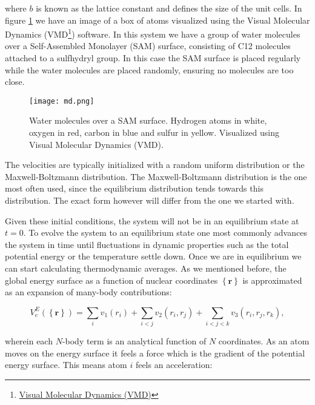 where $b$ is known as the lattice constant and defines
the size of the unit cells.
In figure \ref{fig:md} we have an image of a
box of atoms visualized using the Visual Molecular Dynamics (VMD\footnote
{\href{https://www.ks.uiuc.edu/Research/vmd/}{Visual Molecular Dynamics (VMD)}}) software.
In this system we have a group of water molecules over a Self-Assembled
Monolayer (SAM) surface, consisting of C12 molecules attached to a 
sulfhydryl group. In this case the SAM surface is placed regularly
while the water molecules are placed randomly, ensuring no molecules are too close.

\begin{figure}[H]
    \centering
    \texttt{[image: md.png]}
    \caption{Water molecules over a SAM surface. Hydrogen atoms in white,
        oxygen in red, carbon in blue and sulfur in yellow.
        Visualized using Visual Molecular Dynamics (VMD).}
    \label{fig:md}
\end{figure}

\par
The velocities are typically initialized with a random uniform
distribution or the Maxwell-Boltzmann distribution.
The Maxwell-Boltzmann distribution is the one most often used,
since the equilibrium distribution tends towards this distribution.
The exact form however will differ from the one we started with.
\par
Given these initial conditions, the system will not be in an
equilibrium state at $t=0$. To evolve the system
to an equilibrium state one most commonly advances the system in time
until fluctuations in dynamic
properties such as the total potential energy or the temperature
settle down. Once we are in equilibrium we can start calculating
thermodynamic averages.
\newline
\newline
As we mentioned before, the global energy surface
as a function of nuclear coordinates $\left\{ \bm{r} \right\}$
is approximated as an expansion of many-body contributions:

\begin{equation}
 V_e^E \left(\left\{ \bm{r} \right\}\right) =
    \sum_i v_1(r_i) + \sum_{i < j} v_2(r_i, r_j)
    + \sum_{i < j < k} v_3(r_i, r_j, r_k) , 
\end{equation}

wherein each $N$-body term is an analytical function
of $N$ coordinates.
As an atom moves on the energy surface
it feels a force which is the gradient of the potential energy surface.
This means atom $i$ feels an acceleration:

